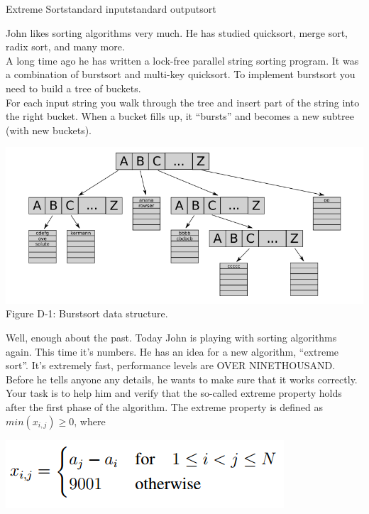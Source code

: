 \begin{problem}{Extreme Sort}{standard input}{standard output}{sort}

John likes sorting algorithms very much. He has studied quicksort, merge sort, radix sort, and many
more.\\
A long time ago he has written a lock-free parallel string sorting program. It was a combination
of burstsort and multi-key quicksort. To implement burstsort you need to build a tree of buckets.\\
For each input string you walk through the tree and insert part of the string into the right bucket.
When a bucket fills up, it ``bursts'' and becomes a new subtree (with new buckets).

\begin{center}
  \includegraphics[scale=0.6]{./texts/src/d1.png}\\
  Figure D-1: Burstsort data structure.
\end{center}

Well, enough about the past. Today John is playing with sorting algorithms again. This time it’s
numbers. He has an idea for a new algorithm, ``extreme sort''. It’s extremely fast, performance
levels are OVER NINETHOUSAND. Before he tells anyone any details, he wants to make sure
that it works correctly.\\
Your task is to help him and verify that the so-called extreme property holds after the first phase
of the algorithm. The extreme property is defined as $min (x_{i,j}) \geq 0$, where

\begin{center}
  \includegraphics[scale=0.5]{./texts/src/d2.png}\\
\end{center}


\end{problem}
